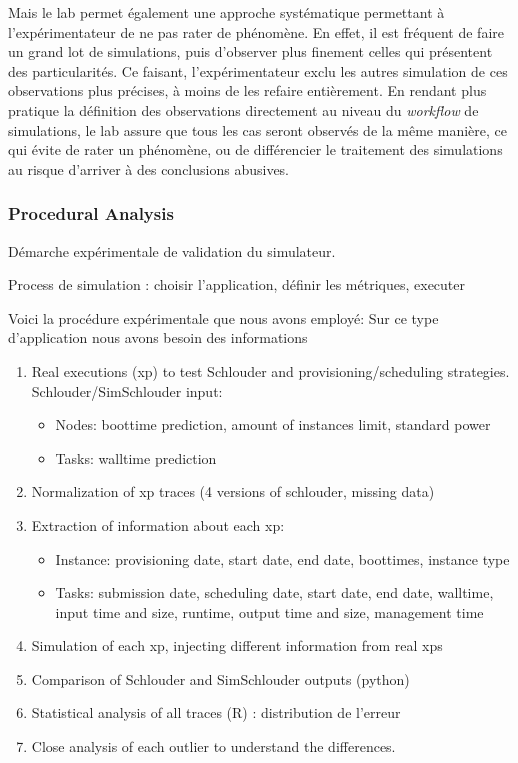 Mais  le   lab  permet   également  une   approche  systématique   permettant  à
l'expérimentateur de  ne pas rater  de phénomène. En  effet, il est  fréquent de
faire un  grand lot  de simulations,  puis d'observer  plus finement  celles qui
présentent des  particularités. Ce  faisant, l'expérimentateur exclu  les autres
simulation  de  ces   observations  plus  précises,  à  moins   de  les  refaire
entièrement. En rendant plus pratique la définition des observations directement
au niveau  du \textit{workflow} de simulations,  le lab assure que  tous les cas
seront observés de  la même manière, ce  qui évite de rater un  phénomène, ou de
différencier le traitement des simulations au risque d'arriver à des conclusions
abusives.


\subsubsection{Procedural Analysis}

Démarche expérimentale de validation du simulateur.

Process de simulation : choisir l'application, définir les métriques, executer 

Voici la procédure expérimentale que nous avons employé:
Sur ce type d'application nous avons besoin des informations 

\begin{enumerate}
 \item Real executions (xp) to test Schlouder and provisioning/scheduling 
strategies.
  Schlouder/SimSchlouder input:
  \begin{itemize}
   \item Nodes: boottime prediction, amount of instances limit, standard power
   \item Tasks: walltime prediction
  \end{itemize}
 
 \item Normalization of xp traces (4 versions of schlouder, missing data)
 \item Extraction of information about each xp:
  \begin{itemize}
   \item Instance: provisioning date, start date, end date, boottimes, instance 
type
   \item Tasks: submission date, scheduling date, start date, end date, 
	  walltime, input time and size, runtime, output time and size, 
management time
  \end{itemize}
 \item Simulation of each xp, injecting different information from real xps
 \item Comparison of Schlouder and SimSchlouder outputs (python)
 \item Statistical analysis of all traces (R) : distribution de l'erreur
            
 \item Close analysis of each outlier to understand the differences. 
\end{enumerate}





